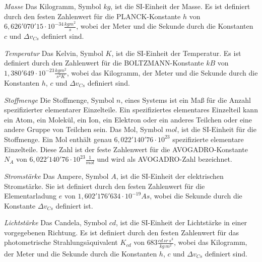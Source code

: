 \textit{Masse}\linebreak
Das Kilogramm, Symbol $kg$, ist die SI-Einheit der Masse. Es ist definiert durch
den festen Zahlenwert für die PLANCK-Konstante $h$ von
$6,626'070'15 \cdot 10^{-34}\frac{kgm^2}{s}$, wobei der Meter und die Sekunde
durch die Konstanten $c$ und $\Delta{v_{Cs}}$ definiert sind.
\vspace{1mm}

\textit{Temperatur}\linebreak
Das Kelvin, Symbol $K$, ist die SI-Einheit der Temperatur.
Es ist definiert durch den Zahlenwert für die BOLTZMANN-Konstante $kB$
von $1,380'649\cdot10^{-23}\frac{kgm^2}{s^2K}$, wobei das Kilogramm, der Meter
und die Sekunde durch die Konstanten $h$, $c$ und $\Delta{v_{Cs}}$ definiert sind.
\vspace{1mm}

\textit{Stoffmenge}\linebreak
Die Stoffmenge, Symbol $n$, eines Systems ist ein Maß für die Anzahl spezifizierter
elementarer Einzelteile. Ein spezifiziertes elementares Einzelteil kann ein Atom,
ein Molekül, ein Ion, ein Elektron oder ein anderes Teilchen oder eine andere Gruppe
von Teilchen sein. Das Mol, Symbol $mol$, ist die SI-Einheit für die Stoffmenge. Ein Mol
enthält genau $6,022'140'76\cdot10^{23}$ spezifizierte elementare Einzelteile.
Diese Zahl ist der feste Zahlenwert für die AVOGADRO-Konstante $N_A$
von $6,022'140'76\cdot10^{23}\frac{1}{mol}$ und wird als AVOGADRO-Zahl bezeichnet.
\vspace{1mm}

\textit{Stromstärke}\linebreak
Das Ampere, Symbol $A$, ist die SI-Einheit der elektrischen Stromstärke. Sie ist definiert
durch den festen Zahlenwert für die Elementarladung $e$ von $1,602'176'634\cdot10^{-19}As$,
wobei die Sekunde durch die Konstante $\Delta{v_{Cs}}$ definiert ist.
\vspace{1mm}

\textit{Lichtstärke}\linebreak
Das Candela, Symbol $cd$, ist die SI-Einheit der Lichtstärke in einer vorgegebenen Richtung.
Es ist definiert durch den festen Zahlenwert für das photometrische Strahlungsäquivalent
$K_{cd}$ von $683\frac{cd\,sr\,s^3}{kg\,m^2}$, wobei das Kilogramm, der Meter und die Sekunde
durch die Konstanten $h$, $c$ und $\Delta{v_{Cs}}$ definiert sind.
\vspace{1mm}


